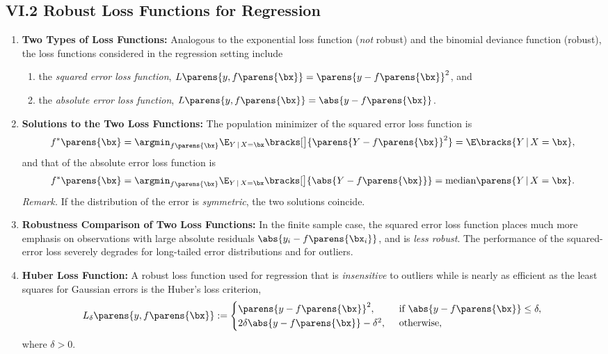 \documentclass[12pt]{article}
\begin{document}
\subsection*{VI.2 Robust Loss Functions for Regression}

\begin{enumerate}[label=\textbf{\arabic*.}]

	\item \textbf{Two Types of Loss Functions:} Analogous to the exponential loss function (\emph{not} robust) and the binomial deviance function (robust), the loss functions considered in the regression setting include 
	\begin{enumerate}
		\item the \textit{squared error loss function}, $L \parens{y, f \parens{\bx}} = \parens{y - f \parens{\bx}}^2$, and 
		\item the \textit{absolute error loss function}, $L \parens{y, f \parens{\bx}} = \abs{y - f \parens{\bx}}$. 
	\end{enumerate}
	
	\item \textbf{Solutions to the Two Loss Functions:} The population minimizer of the squared error loss function is 
	\begin{align*}
		f^* \parens{\bx} = \argmin_{f \parens{\bx}} \E_{Y \,\vert\, X = \bx} \bracks[\big]{\parens{Y - f \parens{\bx}}^2} = \E \bracks{Y \,\vert\, X = \bx}, 
	\end{align*}
	and that of the absolute error loss function is 
	\begin{align*}
		f^* \parens{\bx} = \argmin_{f \parens{\bx}} \E_{Y \,\vert\, X = \bx} \bracks[\big]{\abs{Y - f \parens{\bx}}} = \text{median} \parens{Y \,\vert\, X = \bx}. 
	\end{align*}
	\textit{Remark.} If the distribution of the error is \emph{symmetric}, the two solutions coincide. 
	
	\item \textbf{Robustness Comparison of Two Loss Functions:} In the finite sample case, the squared error loss function places much more emphasis on observations with large absolute residuals $\abs{y_i - f \parens{\bx_i}}$, and is \emph{less robust}. The performance of the squared-error loss severely degrades for long-tailed error distributions and for outliers. 
	
	\item \textbf{Huber Loss Function:} A robust loss function used for regression that is \emph{insensitive} to outliers while is nearly as efficient as the least squares for Gaussian errors is the Huber's loss criterion, 
	\begin{align}
		L_{\delta} \parens{y, f \parens{\bx}} := \begin{cases}
		\parens{y - f \parens{\bx}}^2, & \, \text{ if } \abs{y - f \parens{\bx}} \le \delta, \\
		2 \delta \abs{y - f \parens{\bx}} - \delta^2, & \, \text{ otherwise}, 
		\end{cases}
	\end{align}
	where $\delta > 0$. 
	
\end{enumerate}
\end{document}
